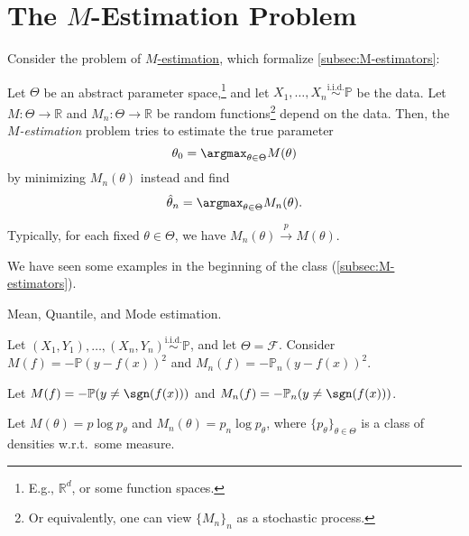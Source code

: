 \section{The \(M\)-Estimation Problem}
Consider the problem of \hyperref[prb:M-estimation]{\(M\)-estimation}, which formalize \autoref{subsec:M-estimators}:

\begin{problem}[\(M\)-estimation]\label{prb:M-estimation}
Let \(\Theta \) be an abstract parameter space,\footnote{E.g., \(\mathbb{R} ^d\), or some function spaces.} and let \(X_1, \dots , X_n \overset{\text{i.i.d.} }{\sim } \mathbb{P} \) be the data. Let \(M \colon \Theta \to \mathbb{R} \) and \(M_n\colon \Theta \to \mathbb{R} \) be random functions\footnote{Or equivalently, one can view \(\{ M_n \} _n\) as a stochastic process.} depend on the data. Then, the \emph{\(M\)-estimation} problem tries to estimate the true parameter
\[
	\theta _0 = \argmax_{\theta \in \Theta } M(\theta )
\]
by minimizing \(M_n(\theta )\) instead and find
\[
	\hat{\theta} _n = \argmax_{\theta \in \Theta } M_n(\theta ).
\]
\end{problem}

\begin{remark}
	Typically, for each fixed \(\theta \in \Theta \), we have \(M_n(\theta ) \overset{p}{\to } M(\theta )\).
\end{remark}

We have seen some examples in the beginning of the class (\autoref{subsec:M-estimators}).

\begin{eg}
	Mean, Quantile, and Mode estimation.
\end{eg}

\begin{eg}
	Let \((X_1, Y_1), \dots , (X_n, Y_n) \overset{\text{i.i.d.} }{\sim } \mathbb{P} \), and let \(\Theta = \mathscr{F} \). Consider \(M(f) = - \mathbb{P} (y - f(x))^2\) and \(M_n(f) = -\mathbb{P} _n (y - f(x))^2\).
\end{eg}

\begin{eg}
	Let \(M(f) = - \mathbb{P} (y \neq \sgn (f(x)))\) and \(M_n(f) = -\mathbb{P} _n(y \neq \sgn (f(x)))\).
\end{eg}

\begin{eg}[MLE]
	Let \(M(\theta ) = p \log p_\theta \) and \(M_n(\theta ) = p_n \log p_\theta \), where \(\{ p_\theta  \}_{\theta \in \Theta } \) is a class of densities w.r.t.\ some measure.
\end{eg}

